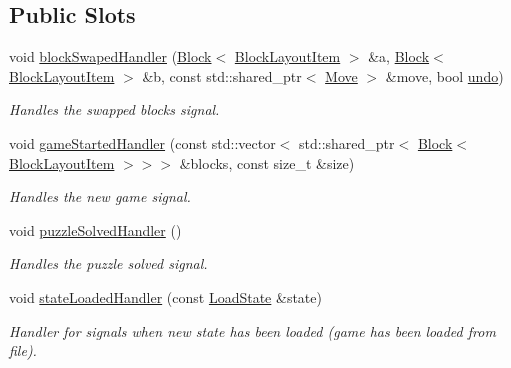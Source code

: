 \subsection*{Public Slots}
\begin{DoxyCompactItemize}
\item 
void \mbox{\hyperlink{class_move_stack_model_a8ff4e26b9eaded33ae9a2588d470feaa}{block\+Swaped\+Handler}} (\mbox{\hyperlink{class_block}{Block}}$<$ \mbox{\hyperlink{class_block_layout_item}{Block\+Layout\+Item}} $>$ \&a, \mbox{\hyperlink{class_block}{Block}}$<$ \mbox{\hyperlink{class_block_layout_item}{Block\+Layout\+Item}} $>$ \&b, const std\+::shared\+\_\+ptr$<$ \mbox{\hyperlink{struct_move}{Move}} $>$ \&move, bool \mbox{\hyperlink{class_move_stack_model_a10ab990b00c1eb0d543d75b8b07eb4bf}{undo}})
\begin{DoxyCompactList}\small\item\em Handles the swapped blocks signal. \end{DoxyCompactList}\item 
void \mbox{\hyperlink{class_move_stack_model_a5a5d359de832234daceef5e216120b65}{game\+Started\+Handler}} (const std\+::vector$<$ std\+::shared\+\_\+ptr$<$ \mbox{\hyperlink{class_block}{Block}}$<$ \mbox{\hyperlink{class_block_layout_item}{Block\+Layout\+Item}} $>$$>$$>$ \&blocks, const size\+\_\+t \&size)
\begin{DoxyCompactList}\small\item\em Handles the new game signal. \end{DoxyCompactList}\item 
void \mbox{\hyperlink{class_move_stack_model_a7fba5a7c9c8cca32112274c87b45fa82}{puzzle\+Solved\+Handler}} ()
\begin{DoxyCompactList}\small\item\em Handles the puzzle solved signal. \end{DoxyCompactList}\item 
void \mbox{\hyperlink{class_move_stack_model_a2c8028466c62b5f8b269b71939c56ef8}{state\+Loaded\+Handler}} (const \mbox{\hyperlink{struct_load_state}{Load\+State}} \&state)
\begin{DoxyCompactList}\small\item\em Handler for signals when new state has been loaded (game has been loaded from file). \end{DoxyCompactList}\end{DoxyCompactItemize}
